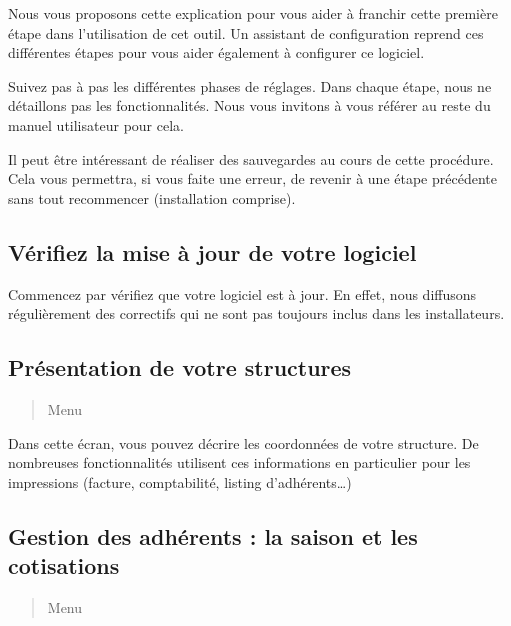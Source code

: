 \documentclass[a4paper,10pt,oneside,french]{sphinxmanual}
\begin{document}
Nous vous proposons cette explication pour vous aider à franchir cette première étape dans l’utilisation de cet outil.
Un assistant de configuration reprend ces différentes étapes pour vous aider également à configurer ce logiciel.

Suivez pas à pas les différentes phases de réglages. Dans chaque étape, nous ne détaillons pas les fonctionnalités.
Nous vous invitons à vous référer au reste du manuel utilisateur pour cela.

Il peut être intéressant de réaliser des sauvegardes au cours de cette procédure.
Cela vous permettra, si vous faite une erreur, de revenir à une étape précédente sans tout recommencer (installation comprise).


\subsection{Vérifiez la mise à jour de votre logiciel}
\label{\detokenize{asso/first_step:verifiez-la-mise-a-jour-de-votre-logiciel}}
Commencez par vérifiez que votre logiciel est à jour.
En effet, nous diffusons régulièrement des correctifs qui ne sont pas toujours inclus dans les installateurs.


\subsection{Présentation de votre structures}
\label{\detokenize{asso/first_step:presentation-de-votre-structures}}\begin{quote}

Menu 
\end{quote}

Dans cette écran, vous pouvez décrire les coordonnées de votre structure.
De nombreuses fonctionnalités utilisent ces informations en particulier pour les impressions (facture, comptabilité, listing d’adhérents…)


\subsection{Gestion des adhérents : la saison et les cotisations}
\label{\detokenize{asso/first_step:gestion-des-adherents-la-saison-et-les-cotisations}}\begin{quote}

Menu 
\end{quote}
\end{document}
